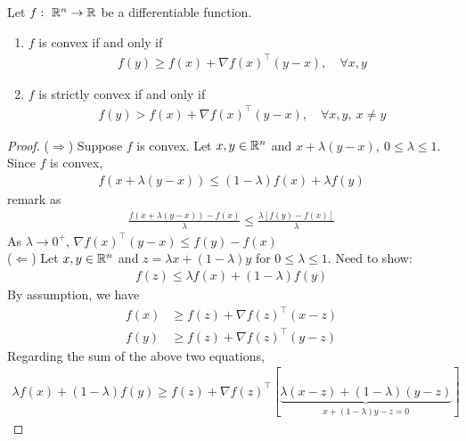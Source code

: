 \documentclass[11pt]{article}
\numberwithin{equation}{section}
\begin{document}
\begin{theorem}
    Let $f: \ \mathbb R^n \rightarrow \mathbb R$ be a differentiable function.\begin{enumerate}
        \item $f$ is convex if and only if \begin{align*}
            f(y) \geq f(x) + \nabla f(x)^\top (y-x), \quad \forall x,y
        \end{align*}
        \item $f$ is strictly convex if and only if \begin{align*}
            f(y) > f(x) + \nabla f(x)^\top (y-x), \quad \forall x,y, \ x \neq y
        \end{align*}
    \end{enumerate}
    \begin{proof}
        ($\Longrightarrow$) Suppose $f$ is convex. Let $x,y \in \mathbb R^n$ and $x+\lambda (y-x), \ 0 \leq \lambda \leq 1$. Since $f$ is convex, \begin{align*}
            f(x+\lambda(y-x)) \leq(1-\lambda) f(x)+\lambda f(y)
        \end{align*} remark as \begin{align*}
            \frac{f(x+\lambda(y-x))-f(x)}{\lambda} \leq \frac{\lambda \left[ f(y) - f(x) \right]}{\lambda}
        \end{align*}
        As $\lambda \rightarrow 0^+$, $\nabla f(x)^\top (y-x) \leq f(y) - f(x)$
        \\
        ($\Longleftarrow$) Let $x,y \in \mathbb R^n$ and $z=\lambda x + (1-\lambda)y$ for $0 \leq \lambda \leq 1$. Need to show:\begin{align*}
            f(z) \leq \lambda f(x)+(1-\lambda)f(y)
        \end{align*}
        By assumption, we have \begin{align*}
            f(x) &\geq f(z)+ \nabla f(z)^{\top}(x-z) \\
            f(y) &\geq f(z)+ \nabla f(z)^{\top}(y-z) 
        \end{align*}
        Regarding the sum of the above two equations, \begin{align*}
            \lambda f(x)+(1-\lambda) f(y) \geq f(z)+ \nabla f(z)^\top \left[ \underbrace{\lambda (x-z) + (1-\lambda)(y-z)}_{x+(1-\lambda) y-z=0} \right]
        \end{align*}
    \end{proof}
\end{theorem}
\end{document}

